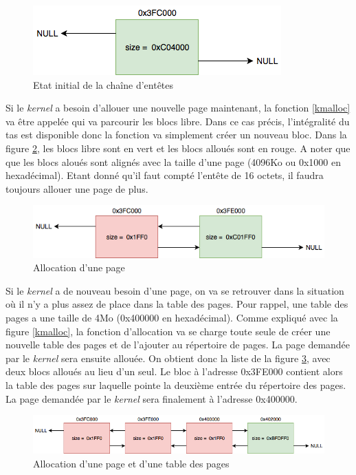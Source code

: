 \begin{figure}[!h]
  \centering
  \includegraphics[scale=0.7]{images/alloc0.png}
  \caption{Etat initial de la chaîne d'entêtes}
  \label{alloc0}
\end{figure}

Si le \textit{kernel} a besoin d'allouer une nouvelle page maintenant, la fonction
\ref{kmalloc} va être appelée qui va parcourir les blocs libre. Dans ce cas précis,
l'intégralité du tas est disponible donc la fonction va simplement créer un nouveau
bloc. Dans la figure \ref{alloc1}, les blocs libre sont en vert et les blocs alloués
sont en rouge. A noter que que les blocs aloués sont alignés avec la taille d'une
page (4096Ko ou 0x1000 en hexadécimal). Etant donné qu'il faut compté l'entête
de 16 octets, il faudra toujours allouer une page de plus.

\begin{figure}[!h]
  \centering
  \includegraphics[scale=0.6]{images/alloc1.png}
  \caption{Allocation d'une page}
  \label{alloc1}
\end{figure}

Si le \textit{kernel} a de nouveau besoin d'une page, on va se retrouver dans la
situation où il n'y a plus assez de place dans la table des pages. Pour rappel,
une table des pages a une taille de 4Mo (0x400000 en hexadécimal). Comme expliqué
avec la figure \ref{kmalloc}, la fonction d'allocation va se charge toute seule
de créer une nouvelle table des pages et de l'ajouter au répertoire de pages.
La page demandée par le \textit{kernel} sera ensuite allouée. On obtient donc
la liste de la figure \ref{alloc2}, avec deux blocs alloués au lieu d'un seul.
Le bloc à l'adresse 0x3FE000 contient alors la table des pages sur laquelle pointe
la deuxième entrée du répertoire des pages. La page demandée par le \textit{kernel}
sera finalement à l'adresse 0x400000.

\begin{figure}[!h]
  \centering
  \includegraphics[scale=0.6]{images/alloc2.png}
  \caption{Allocation d'une page et d'une table des pages}
  \label{alloc2}
\end{figure}

